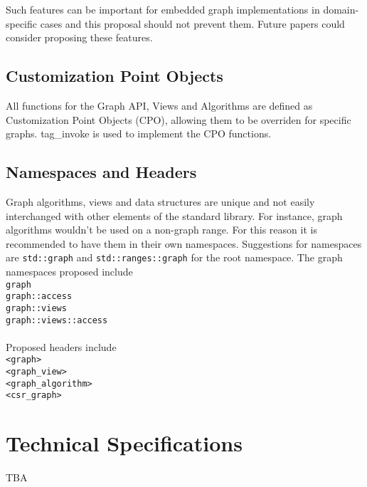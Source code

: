 \documentclass[10pt,onecolumn]{article}
\begin{document}
Such features can be important for embedded graph implementations in domain-specific cases and this proposal should not prevent them. 
Future papers could consider proposing these features.

\subsection{Customization Point Objects}
All functions for the Graph API, Views and Algorithms are defined as Customization Point Objects (CPO), allowing them to be overriden for
specific graphs. tag\_invoke is used to implement the CPO functions.

\subsection{Namespaces and Headers}
Graph algorithms, views and data structures are unique and not easily interchanged with other elements of the standard library. For
instance, graph algorithms wouldn't be used on a non-graph range. For this reason it is recommended to have them in their own 
namespaces. Suggestions for namespaces are \texttt{std::graph} and
\texttt{std::ranges::graph} for the root namespace. The graph namespaces proposed include
\\
\hspace*{20mm}\texttt{graph}\\
\hspace*{20mm}\texttt{graph::access}\\
\hspace*{20mm}\texttt{graph::views}\\
\hspace*{20mm}\texttt{graph::views::access}\\
\\
Proposed headers include\\
\hspace*{20mm}\texttt{<graph>}\\
\hspace*{20mm}\texttt{<graph\_view>}\\
\hspace*{20mm}\texttt{<graph\_algorithm>}\\
\hspace*{20mm}\texttt{<csr\_graph>}\\

\section{Technical Specifications}
TBA
\end{document}
